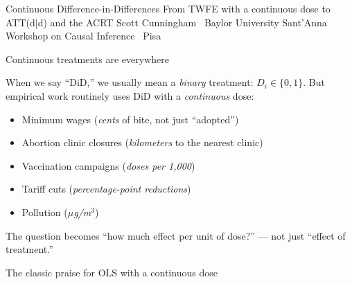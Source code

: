 \documentclass[aspectratio=169,12pt,t]{beamer}
\begin{document}

\codechellatitle
  {Continuous Difference-in-Differences}
  {From TWFE with a continuous dose to ATT(d$|$d) and the ACRT}
  {Scott Cunningham \textperiodcentered\ Baylor University}
  {Sant'Anna Workshop on Causal Inference \textperiodcentered\ Pisa}


\begin{frame}{Continuous treatments are everywhere}
\vspace{0.2cm}

When we say ``DiD,'' we usually mean a \textit{binary} treatment: $D_i \in \{0,1\}$. \;But empirical work routinely uses DiD with a \textit{continuous} dose:

\vspace{0.4cm}
\begin{itemize}\small\setlength\itemsep{1pt}
  \item Minimum wages (\textit{cents} of bite, not just ``adopted'')
  \item Abortion clinic closures (\textit{kilometers} to the nearest clinic)
  \item Vaccination campaigns (\textit{doses per 1{,}000})
  \item Tariff cuts (\textit{percentage-point reductions})
  \item Pollution (\textit{$\mu$g/m$^3$})
\end{itemize}

\vspace{0.3cm}
 \;The question becomes ``how much effect per unit of dose?'' --- not just ``effect of treatment.''
\end{frame}

\begin{frame}{The classic praise for OLS with a continuous dose}
\vspace{0.2cm}


\vspace{0.5cm}


\vspace{0.4em}
\end{frame}
\end{document}
